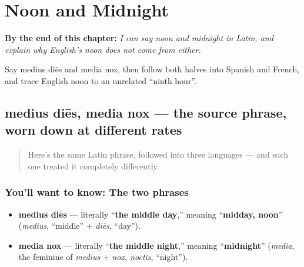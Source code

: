 
\chapter{Noon and Midnight}
\label{ch:la-noon-and-midnight}

\begin{chapteropening}
\textbf{By the end of this chapter:} \emph{I can say noon and midnight in Latin, and explain why English's noon does not come from either.}

Say medius diēs and media nox, then follow both halves into Spanish and French, and trace English noon to an unrelated \textquotedblleft{}ninth hour\textquotedblright{}.
\end{chapteropening}

\section[medius diēs, media nox]{medius diēs, media nox — the source phrase, worn down at different rates}

\label{lesson:LA-C12-medius-dies-nox}



\begin{quote}
Here's the same Latin phrase, followed into three languages — and each one treated it completely differently.
\end{quote}

\subsection*{You'll want to know: The two phrases}
\begin{itemize}
\raggedright
  \item \textbf{medius diēs} — literally \textquotedblleft{}\textbf{the middle day},\textquotedblright{} meaning \textquotedblleft{}\textbf{midday, noon}\textquotedblright{} (\emph{medius}, \textquotedblleft{}middle\textquotedblright{} + \emph{diēs}, \textquotedblleft{}day\textquotedblright{}).
  \item \textbf{media nox} — literally \textquotedblleft{}\textbf{the middle night},\textquotedblright{} meaning \textquotedblleft{}\textbf{midnight}\textquotedblright{} (\emph{media}, the feminine of \emph{medius} + \emph{nox, noctis}, \textquotedblleft{}night\textquotedblright{}).
\end{itemize}

